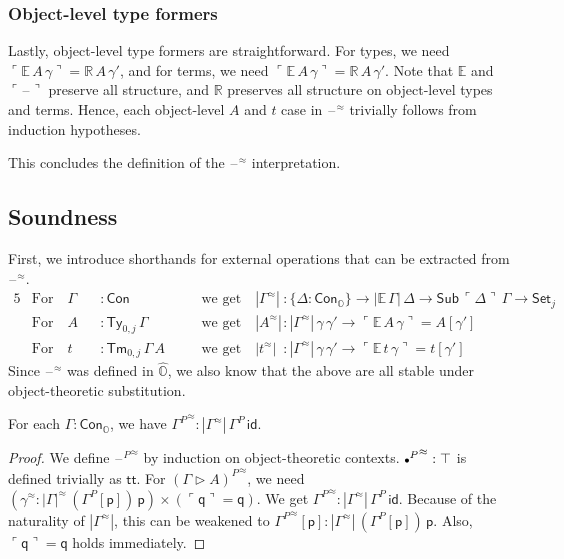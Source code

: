 \documentclass[acmsmall]{acmart}
\newcommand{\msf}[1]{\mathsf{#1}}
\newcommand{\mbb}[1]{\mathbb{#1}}
\newcommand{\ext}{\triangleright}
\newcommand{\mbbo}{\mbb{O}}
\newcommand{\Con}{\msf{Con}}
\newcommand{\Sub}{\msf{Sub}}
\newcommand{\Ty}{\msf{Ty}}
\newcommand{\Tm}{\msf{Tm}}
\newcommand{\Cono}{\msf{Con}_{\mbbo}}
\newcommand{\p}{\mathsf{p}}
\newcommand{\q}{\mathsf{q}}
\renewcommand{\tt}{\msf{tt}}
\newcommand{\emptycon}{\scaleobj{.75}\bullet}
\newcommand{\id}{\msf{id}}
\newcommand{\Set}{\mathsf{Set}}
\newcommand{\blank}{{\mathord{\hspace{1pt}\text{--}\hspace{1pt}}}}
\newcommand{\emb}[1]{\ulcorner#1\urcorner}
\newcommand{\hato}{\bm\hat{\mbbo}}
\newcommand{\ev}{\mbb{E}}
\newcommand{\re}{\mbb{R}}
\theoremstyle{remark}
\newcommand{\rel}{^{\approx}}
\begin{document}
\subsubsection{Object-level type formers}
Lastly, object-level type formers are straightforward. For types, we need
$\emb{\ev\,A\,\gamma} = \re\,A\,\gamma'$, and for terms, we need
$\emb{\ev\,A\,\gamma} = \re\,A\,\gamma'$. Note that $\ev$ and $\emb{\blank}$
preserve all structure, and $\re$ preserves all structure on object-level types
and terms. Hence, each object-level $A$ and $t$ case in $\blank\rel$ trivially
follows from induction hypotheses.

This concludes the definition of the $\blank\rel$ interpretation.

\subsection{Soundness}

\begin{definition} First, we introduce shorthands for
external operations that can be extracted from $\blank\rel$.
\begin{alignat*}{5}
  & \text{For}\hspace{1em} \Gamma &&: \Con \hspace{1em}&&\text{we get}\hspace{1em}
         |\Gamma\rel| &&: \{\Delta : \Cono\} \to |\ev\,\Gamma|\,\Delta \to \Sub\,\emb{\Delta}\,\Gamma \to \Set_j\\
  & \text{For}\hspace{1em} A &&: \Ty_{0,j}\,\Gamma \hspace{1em}&&\text{we get}\hspace{1em} |A\rel| &&: |\Gamma\rel|\,\gamma\,\gamma' \to \emb{\ev\,A\,\gamma} = A[\gamma']\\
  & \text{For}\hspace{1em} t &&: \Tm_{0,j}\,\Gamma\,A \hspace{1em}&&\text{we get}\hspace{1em}|t\rel| &&: |\Gamma\rel|\,\gamma\,\gamma' \to \emb{\ev\,t\,\gamma} = t[\gamma']
\end{alignat*}
Since $\blank\rel$ was defined in $\hato$, we also know that the above are all
stable under object-theoretic substitution.
\end{definition}

\begin{theorem}
For each $\Gamma : \Cono$, we have ${\Gamma^P}\rel : |\Gamma\rel|\,\Gamma^P\,\id$.
\end{theorem}
\begin{proof}
We define ${\blank^P}\rel$ by induction on object-theoretic contexts.
${\emptycon^P}\rel : \top$ is defined trivially as $\tt$. For ${(\Gamma \ext
  A)^P}\rel$, we need $(\gamma\rel : |\Gamma|\rel\,(\Gamma^P[\p])\,\p) \times
(\emb{\q} = \q)$. We get ${\Gamma^P}\rel : |\Gamma\rel|\,\Gamma^P\,\id$. Because
of the naturality of $|\Gamma\rel|$, this can be weakened to ${\Gamma^P}\rel[\p]
: |\Gamma\rel|\,(\Gamma^P[\p])\,\p$. Also, $\emb{\q} = \q$ holds immediately.
\end{proof}
\end{document}
